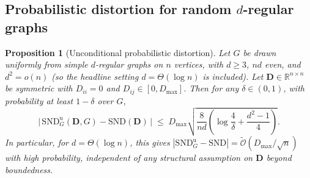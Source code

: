 \documentclass{article}
\theoremstyle{plain}
\newtheorem{proposition}[theorem]{Proposition}
\theoremstyle{definition}
\theoremstyle{remark}
\newcommand{\R}{\mathbb{R}}
\newcommand{\SND}{\ensuremath{\mathrm{SND}}}
\newcommand{\SNDG}{\mathrm{SND}_{G}}
\begin{document}
\subsection*{Probabilistic distortion for random $d$-regular graphs}

\begin{proposition}[Unconditional probabilistic distortion]
\label{prop:probabilistic-distortion}
Let $G$ be drawn uniformly from simple $d$-regular graphs on $n$
vertices, with $d\geq 3$, $nd$ even, and $d^2 = o(n)$ (so the headline
setting $d=\Theta(\log n)$ is included). Let $\mathbf{D}\in\R^{n\times n}$
be symmetric with $D_{ii}=0$ and $D_{ij}\in[0,D_{\max}]$. Then for any
$\delta\in(0,1)$, with probability at least $1-\delta$ over $G$,
\begin{equation}
\label{eq:probabilistic-distortion}
\bigl|\,\SNDG^{\mathrm{u}}(\mathbf{D},G)-\SND(\mathbf{D})\,\bigr|
\;\leq\;
D_{\max}\sqrt{\frac{8}{nd}\left(\log\frac{4}{\delta}
+\frac{d^2-1}{4}\right)}.
\end{equation}
In particular, for $d=\Theta(\log n)$, this gives
$|\SNDG^{\mathrm{u}}-\SND|
=\widetilde{\mathcal{O}}(D_{\max}/\sqrt{n})$ with high probability,
independent of any structural assumption on $\mathbf{D}$ beyond
boundedness.
\end{proposition}
\end{document}
